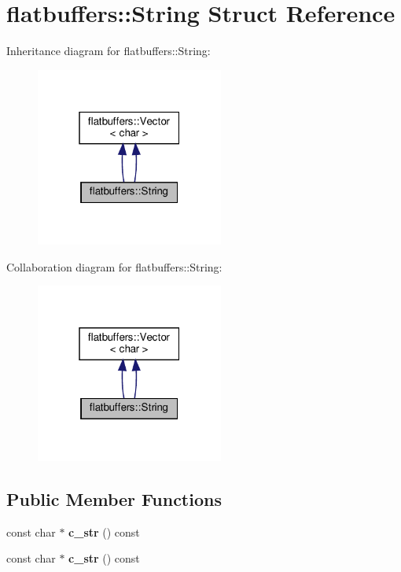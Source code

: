 \hypertarget{structflatbuffers_1_1String}{}\section{flatbuffers\+:\+:String Struct Reference}
\label{structflatbuffers_1_1String}


Inheritance diagram for flatbuffers\+:\+:String\+:
\nopagebreak
\begin{figure}[H]
\begin{center}
\leavevmode
\includegraphics[width=175pt]{structflatbuffers_1_1String__inherit__graph}
\end{center}
\end{figure}


Collaboration diagram for flatbuffers\+:\+:String\+:
\nopagebreak
\begin{figure}[H]
\begin{center}
\leavevmode
\includegraphics[width=175pt]{structflatbuffers_1_1String__coll__graph}
\end{center}
\end{figure}
\subsection*{Public Member Functions}
\begin{DoxyCompactItemize}
\item 
\mbox{\label{structflatbuffers_1_1String_a4d0c586883282e5b93ddbb02f3d71eef}} 
const char $\ast$ {\bfseries c\+\_\+str} () const
\item 
\mbox{\label{structflatbuffers_1_1String_a4d0c586883282e5b93ddbb02f3d71eef}} 
const char $\ast$ {\bfseries c\+\_\+str} () const
\end{DoxyCompactItemize}

